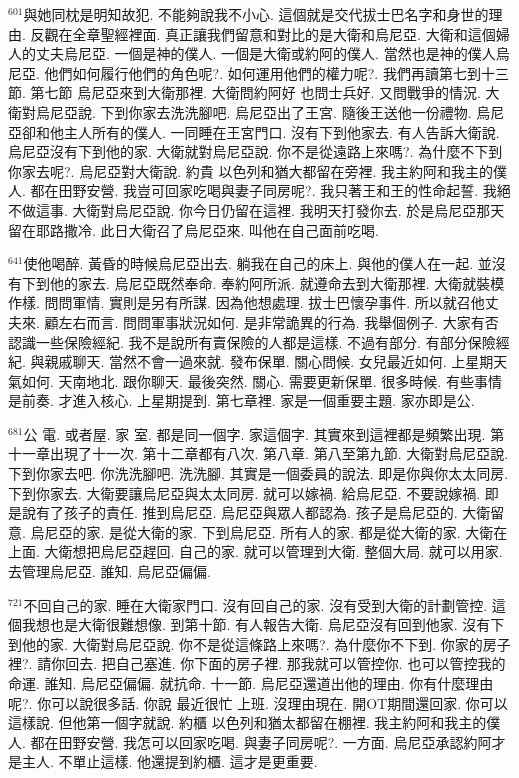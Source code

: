 \documentclass{book}
\begin{document}
$^{601}$與她同枕是明知故犯.
不能夠說我不小心.
這個就是交代拔士巴名字和身世的理由.
反觀在全章聖經裡面.
真正讓我們留意和對比的是大衛和烏尼亞.
大衛和這個婦人的丈夫烏尼亞.
一個是神的僕人.
一個是大衛或約阿的僕人.
當然也是神的僕人烏尼亞.
他們如何履行他們的角色呢?.
如何運用他們的權力呢?.
我們再讀第七到十三節.
第七節 烏尼亞來到大衛那裡.
大衛問約阿好 也問士兵好.
又問戰爭的情況.
大衛對烏尼亞說.
下到你家去洗洗腳吧.
烏尼亞出了王宮.
隨後王送他一份禮物.
烏尼亞卻和他主人所有的僕人.
一同睡在王宮門口.
沒有下到他家去.
有人告訴大衛說.
烏尼亞沒有下到他的家.
大衛就對烏尼亞說.
你不是從遠路上來嗎?.
為什麼不下到你家去呢?.
烏尼亞對大衛說.
約貴 以色列和猶大都留在旁裡.
我主約阿和我主的僕人.
都在田野安營.
我豈可回家吃喝與妻子同房呢?.
我只著王和王的性命起誓.
我絕不做這事.
大衛對烏尼亞說.
你今日仍留在這裡.
我明天打發你去.
於是烏尼亞那天留在耶路撒冷.
此日大衛召了烏尼亞來.
叫他在自己面前吃喝.

$^{641}$使他喝醉.
黃昏的時候烏尼亞出去.
躺我在自己的床上.
與他的僕人在一起.
並沒有下到他的家去.
烏尼亞既然奉命.
奉約阿所派.
就遵命去到大衛那裡.
大衛就裝模作樣.
問問軍情.
實則是另有所謀.
因為他想處理.
拔士巴懷孕事件.
所以就召他丈夫來.
顧左右而言.
問問軍事狀況如何.
是非常詭異的行為.
我舉個例子.
大家有否認識一些保險經紀.
我不是說所有賣保險的人都是這樣.
不過有部分.
有部分保險經紀.
與親戚聊天.
當然不會一過來就.
發布保單.
關心問候.
女兒最近如何.
上星期天氣如何.
天南地北.
跟你聊天.
最後突然.
關心.
需要更新保單.
很多時候.
有些事情是前奏.
才進入核心.
上星期提到.
第七章裡.
家是一個重要主題.
家亦即是公.

$^{681}$公 電.
或者屋.
家 室.
都是同一個字.
家這個字.
其實來到這裡都是頻繁出現.
第十一章出現了十一次.
第十二章都有八次.
第八章.
第八至第九節.
大衛對烏尼亞說.
下到你家去吧.
你洗洗腳吧.
洗洗腳.
其實是一個委員的說法.
即是你與你太太同房.
下到你家去.
大衛要讓烏尼亞與太太同房.
就可以嫁禍.
給烏尼亞.
不要說嫁禍.
即是說有了孩子的責任.
推到烏尼亞.
烏尼亞與眾人都認為.
孩子是烏尼亞的.
大衛留意.
烏尼亞的家.
是從大衛的家.
下到烏尼亞.
所有人的家.
都是從大衛的家.
大衛在上面.
大衛想把烏尼亞趕回.
自己的家.
就可以管理到大衛.
整個大局.
就可以用家.
去管理烏尼亞.
誰知.
烏尼亞偏偏.

$^{721}$不回自己的家.
睡在大衛家門口.
沒有回自己的家.
沒有受到大衛的計劃管控.
這個我想也是大衛很難想像.
到第十節.
有人報告大衛.
烏尼亞沒有回到他家.
沒有下到他的家.
大衛對烏尼亞說.
你不是從這條路上來嗎?.
為什麼你不下到.
你家的房子裡?.
請你回去.
把自己塞進.
你下面的房子裡.
那我就可以管控你.
也可以管控我的命運.
誰知.
烏尼亞偏偏.
就抗命.
十一節.
烏尼亞還道出他的理由.
你有什麼理由呢?.
你可以說很多話.
你說 最近很忙 上班.
沒理由現在.
開OT期間還回家.
你可以這樣說.
但他第一個字就說.
約櫃 以色列和猶太都留在棚裡.
我主約阿和我主的僕人.
都在田野安營.
我怎可以回家吃喝.
與妻子同房呢?.
一方面.
烏尼亞承認約阿才是主人.
不單止這樣.
他還提到約櫃.
這才是更重要.
\end{document}
